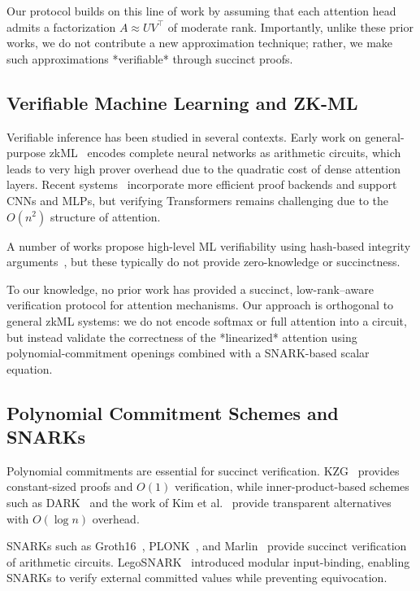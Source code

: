 \documentclass[11pt]{article}
\begin{document}
Our protocol builds on this line of work by assuming that each attention
head admits a factorization $A \approx UV^\top$ of moderate rank.  
Importantly, unlike these prior works, we do not contribute a new
approximation technique; rather, we make such approximations *verifiable*
through succinct proofs.

\subsection{Verifiable Machine Learning and ZK-ML}

Verifiable inference has been studied in several contexts.
Early work on general-purpose zkML~\cite{liu2021zkcnn}
encodes complete neural networks as arithmetic circuits, which leads to
very high prover overhead due to the quadratic cost of dense attention
layers.  
Recent systems~\cite{ezkl, lu2023tensorplonk} incorporate more
efficient proof backends and support CNNs and MLPs, but verifying
Transformers remains challenging due to the $O(n^2)$ structure of
attention.

A number of works propose high-level ML verifiability using hash-based
integrity arguments~\cite{cormode2011verifying}, but these typically do
not provide zero-knowledge or succinctness.

To our knowledge, no prior work has provided a succinct, 
low-rank–aware verification protocol for attention mechanisms.
Our approach is orthogonal to general zkML systems:  
we do not encode softmax or full attention into a circuit, but instead
validate the correctness of the *linearized* attention using
polynomial-commitment openings combined with a SNARK-based scalar
equation.

\subsection{Polynomial Commitment Schemes and SNARKs}

Polynomial commitments are essential for succinct verification.
KZG~\cite{kzg10} provides constant-sized proofs and $O(1)$ verification,
while inner-product-based schemes such as DARK~\cite{bunz2019dark} and the
work of Kim et al.~\cite{kim2023etpc} provide transparent
alternatives with $O(\log n)$ overhead.

SNARKs such as Groth16~\cite{groth16}, PLONK~\cite{plonk2019}, and
Marlin~\cite{marlin2020} provide succinct verification of arithmetic
circuits.  
LegoSNARK~\cite{campanelli2019legosnark} introduced modular input-binding, enabling
SNARKs to verify external committed values while preventing
equivocation.
\end{document}
